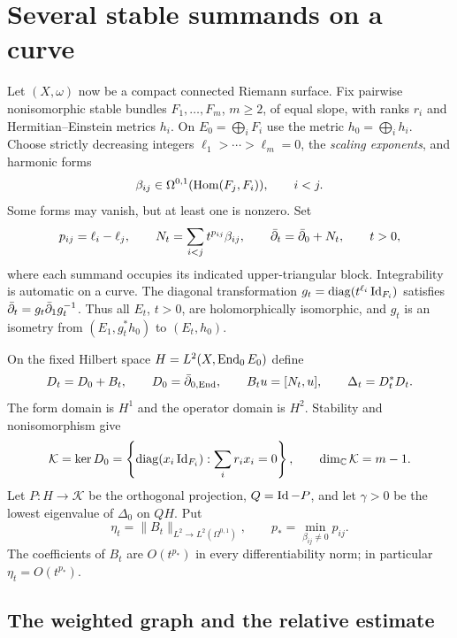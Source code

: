 \section{Several stable summands on a curve}\label{sec:several}

Let $(X,\omega)$ now be a compact connected Riemann surface. Fix pairwise
nonisomorphic stable bundles $F_1,\ldots,F_m$, $m\ge2$, of equal slope,
with ranks $r_i$ and Hermitian--Einstein metrics $h_i$. On
$E_0=\bigoplus_iF_i$ use the metric $h_0=\bigoplus_i h_i$.
Choose strictly decreasing integers $\ell_1>\cdots>\ell_m=0$, the
\emph{scaling exponents}, and harmonic forms
\[
 \beta_{ij}\in\Omega^{0,1}(\operatorname{Hom}(F_j,F_i)),\qquad i<j.
\]
Some forms may vanish, but at least one is nonzero. Set
\begin{equation}\label{eq:several-family}
 p_{ij}=\ell_i-\ell_j,\qquad
 N_t=\sum_{i<j}t^{p_{ij}}\beta_{ij},\qquad
 \bar\partial_t=\bar\partial_0+N_t,\qquad t>0,
\end{equation}
where each summand occupies its indicated upper-triangular block.
Integrability is automatic on a curve. The diagonal transformation
$g_t=\operatorname{diag}(t^{\ell_i}\operatorname{Id}_{F_i})$ satisfies
$\bar\partial_t=g_t\bar\partial_1g_t^{-1}$. Thus all $E_t$, $t>0$, are holomorphically
isomorphic, and $g_t$ is an isometry from $(E_1,g_t^*h_0)$ to $(E_t,h_0)$.

On the fixed Hilbert space $H=L^2(X,\operatorname{End}_0 E_0)$ define
\[
 D_t=D_0+B_t,\qquad D_0=\bar\partial_{0,\operatorname{End}},\qquad
 B_tu=[N_t,u],\qquad \Delta_t=D_t^*D_t.
\]
The form domain is $H^1$ and the operator domain is $H^2$. Stability
and nonisomorphism give
\begin{equation}\label{eq:split-kernel}
 \mathcal K=\operatorname{ker} D_0
 =\left\{\operatorname{diag}(x_i\operatorname{Id}_{F_i}):\sum_i r_ix_i=0\right\},
 \qquad \dim_{\mathbb C}\mathcal K=m-1.
\end{equation}
Let $P:H\to\mathcal K$ be the orthogonal projection, $Q=\operatorname{Id}-P$, and
let $\gamma>0$ be the lowest eigenvalue of $\Delta_0$ on $QH$. Put
\[
 \eta_t=\lVert B_t\rVert_{L^2\to L^2(\Omega^{0,1})},\qquad
 p_* =\min_{\beta_{ij}\ne0}p_{ij}.
\]
The coefficients of $B_t$ are $O(t^{p_*})$ in every differentiability
norm; in particular $\eta_t=O(t^{p_*})$.

\subsection{The weighted graph and the relative estimate}

